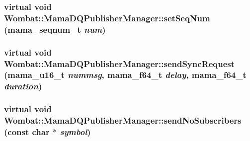 \label{classWombat_1_1MamaDQPublisherManager_a884251f60c33ff386a816ee9178eceb2}
\hypertarget{classWombat_1_1MamaDQPublisherManager_a6f10b19c4e6243f07c5a6430120d84f8}{
\subsubsection[{setSeqNum}]{\setlength{\rightskip}{0pt plus 5cm}virtual void Wombat::MamaDQPublisherManager::setSeqNum (mama\_\-seqnum\_\-t {\em num})}}
\label{classWombat_1_1MamaDQPublisherManager_a6f10b19c4e6243f07c5a6430120d84f8}
\hypertarget{classWombat_1_1MamaDQPublisherManager_af45062d3a82dfea51715eb5c49cff2b2}{
\subsubsection[{sendSyncRequest}]{\setlength{\rightskip}{0pt plus 5cm}virtual void Wombat::MamaDQPublisherManager::sendSyncRequest (mama\_\-u16\_\-t {\em nummsg}, \/  mama\_\-f64\_\-t {\em delay}, \/  mama\_\-f64\_\-t {\em duration})}}
\label{classWombat_1_1MamaDQPublisherManager_af45062d3a82dfea51715eb5c49cff2b2}
\hypertarget{classWombat_1_1MamaDQPublisherManager_a79c5143b738d1c377b75476a8f64c3ed}{
\subsubsection[{sendNoSubscribers}]{\setlength{\rightskip}{0pt plus 5cm}virtual void Wombat::MamaDQPublisherManager::sendNoSubscribers (const char $\ast$ {\em symbol})}}
\label{classWombat_1_1MamaDQPublisherManager_a79c5143b738d1c377b75476a8f64c3ed}
